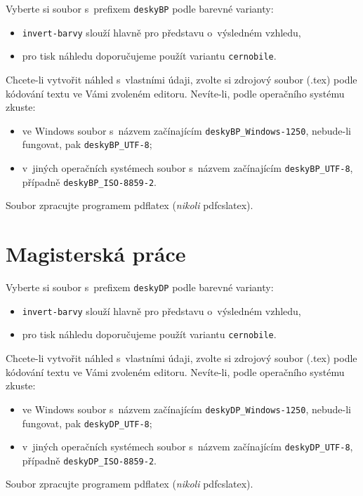 \documentclass[a4paper]{article}
\begin{document}
Vyberte si soubor s~prefixem \verb|deskyBP| podle barevné varianty:
\begin{itemize}
	\item \verb|invert-barvy| slouží hlavně pro představu o~výsledném vzhledu,
	\item pro tisk náhledu doporučujeme použít variantu \verb|cernobile|.
\end{itemize}

Chcete-li vytvořit náhled s~vlastními údaji, zvolte si zdrojový soubor (.tex) podle kódování textu ve Vámi zvoleném editoru. Nevíte-li, podle operačního systému zkuste:
\begin{itemize}
	\item ve Windows soubor s~názvem začínajícím \verb|deskyBP_Windows-1250|, nebude-li fungovat, pak \verb|deskyBP_UTF-8|;
	\item v~jiných operačních systémech soubor s~názvem začínajícím \verb|deskyBP_UTF-8|, případně \verb|deskyBP_ISO-8859-2|.
\end{itemize}

Soubor zpracujte programem pdflatex (\emph{nikoli} pdfcslatex).

\section*{Magisterská práce}

Vyberte si soubor s~prefixem \verb|deskyDP| podle barevné varianty:
\begin{itemize}
	\item \verb|invert-barvy| slouží hlavně pro představu o~výsledném vzhledu,
	\item pro tisk náhledu doporučujeme použít variantu \verb|cernobile|.
\end{itemize}

Chcete-li vytvořit náhled s~vlastními údaji, zvolte si zdrojový soubor (.tex) podle kódování textu ve Vámi zvoleném editoru. Nevíte-li, podle operačního systému zkuste:
\begin{itemize}
	\item ve Windows soubor s~názvem začínajícím \verb|deskyDP_Windows-1250|, nebude-li fungovat, pak \verb|deskyDP_UTF-8|;
	\item v~jiných operačních systémech soubor s~názvem začínajícím \verb|deskyDP_UTF-8|, případně \verb|deskyDP_ISO-8859-2|.
\end{itemize}

Soubor zpracujte programem pdflatex (\emph{nikoli} pdfcslatex).
\end{document}
